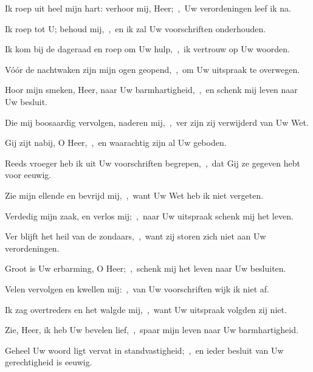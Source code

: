 \documentclass[12pt,twoside,a5paper]{article}
\begin{document}
\begin{halfparskip}
   Ik roep uit heel mijn hart: verhoor mij, Heer;~\sep\ Uw verordeningen leef ik na.


  Ik roep tot U; behoud mij,~\sep\ en ik zal Uw voorschriften onderhouden.

  Ik kom bij de dageraad en roep om Uw hulp,~\sep\ ik vertrouw op Uw woorden.

  Vóór de nachtwaken zijn mijn ogen geopend,~\sep\ om Uw uitspraak te overwegen.

  Hoor mijn smeken, Heer, naar Uw barmhartigheid,~\sep\ en schenk mij leven naar Uw besluit.

  Die mij boosaardig vervolgen, naderen mij,~\sep\ ver zijn zij verwijderd van Uw Wet.

  Gij zijt nabij, O Heer,~\sep\ en waarachtig zijn al Uw geboden.

  Reeds vroeger heb ik uit Uw voorschriften begrepen,~\sep\ dat Gij ze gegeven hebt voor eeuwig.
\end{halfparskip}

\begin{halfparskip}
   Zie mijn ellende en bevrijd mij,~\sep\ want Uw Wet heb ik niet vergeten.


  Verdedig mijn zaak, en verlos mij;~\sep\ naar Uw uitspraak schenk mij het leven.

  Ver blijft het heil van de zondaars,~\sep\ want zij storen zich niet aan Uw verordeningen.

  Groot is Uw erbarming, O Heer;~\sep\ schenk mij het leven naar Uw besluiten.

  Velen vervolgen en kwellen mij:~\sep\ van Uw voorschriften wijk ik niet af.

  Ik zag overtreders en het walgde mij,~\sep\ want Uw uitspraak volgden zij niet.

  Zie, Heer, ik heb Uw bevelen lief,~\sep\ spaar mijn leven naar Uw barmhartigheid.

  Geheel Uw woord ligt vervat in standvastigheid;~\sep\ en ieder besluit van Uw gerechtigheid is eeuwig.
\end{halfparskip}
\end{document}
